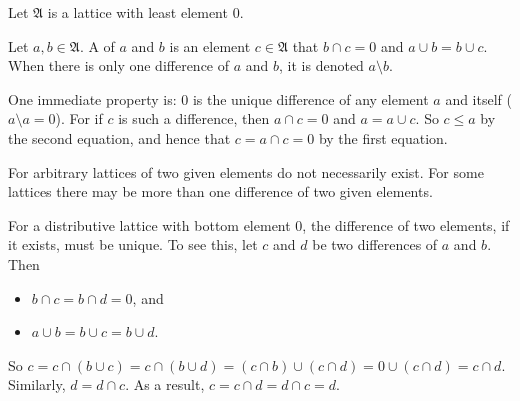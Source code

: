 \documentclass[12pt]{article}
\begin{document}
Let $\mathfrak{A}$ is a lattice with least element $0$.

Let $a,b\in\mathfrak{A}$. A \emph{} of $a$ and $b$ is an element $c\in\mathfrak{A}$ that $b\cap c=0$ and $a\cup b=b\cup c$.  When there is only one difference of $a$ and $b$, it is denoted $a\setminus b$.

One immediate property is: $0$ is the unique difference of any element $a$ and itself ($a\setminus a=0$).  For if $c$ is such a difference, then $a\cap c=0$ and $a=a\cup c$.  So $c\le a$ by the second equation, and hence that $c=a\cap c=0$ by the first equation.

For arbitrary lattices \emph{} of two given elements do not necessarily exist. For some lattices there may be more than one difference of two given elements.

For a distributive lattice with bottom element $0$, the difference of two elements, if it exists, must be unique.  To see this, let $c$ and $d$ be two differences of $a$ and $b$.  Then
\begin{itemize}
\item $b\cap c=b\cap d=0$, and
\item $a\cup b = b\cup c = b\cup d$.
\end{itemize}
So $c= c\cap (b\cup c)= c\cap (b\cup d)= (c \cap b)\cup (c\cap d)=0\cup (c\cap d)= c\cap d$.  Similarly, $d=d\cap c$.  As a result, $c = c\cap d=d\cap c=d$.
\end{document}
